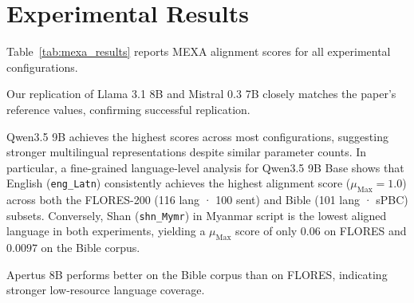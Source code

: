 \documentclass{article}
\begin{document}
\section{Experimental Results}
\label{sec:results}

Table~\ref{tab:mexa_results} reports MEXA alignment scores
for all experimental configurations.

Our replication of Llama 3.1 8B  and Mistral 0.3 7B closely matches the paper's
reference values, confirming successful replication.

Qwen3.5 9B achieves the highest scores across most configurations,
suggesting stronger multilingual representations despite similar
parameter counts. In particular, a fine-grained language-level analysis for Qwen3.5 9B Base shows that English (\texttt{eng\_Latn}) consistently achieves the highest alignment score ($\mu_{\text{Max}} = 1.0$) across both the FLORES-200 (116 lang · 100 sent) and Bible (101 lang · sPBC) subsets. Conversely, Shan (\texttt{shn\_Mymr}) in Myanmar script is the lowest aligned language in both experiments, yielding a $\mu_{\text{Max}}$ score of only $0.06$ on FLORES and $0.0097$ on the Bible corpus.

Apertus 8B performs better on the Bible corpus than on FLORES,
indicating stronger low-resource language coverage.
\end{document}
